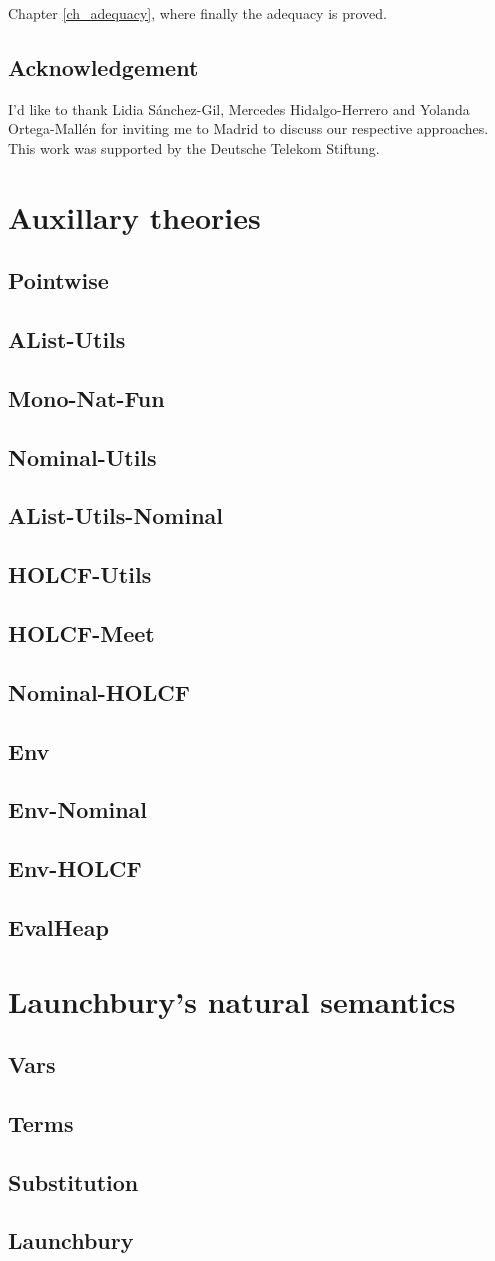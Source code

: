 \documentclass[11pt,a4paper,parskip=half]{scrartcl}
\begin{document}
Chapter \ref{ch_adequacy}, where finally the adequacy is proved.

%
%

\subsection{Acknowledgement}


I’d like to thank Lidia Sánchez-Gil, Mercedes Hidalgo-Herrero and Yolanda Ortega-Mallén for inviting me to Madrid to discuss our respective approaches.\\
This work was supported by the Deutsche Telekom Stiftung.

\clearpage
\newcommand{\theory}[1]{\subsection{#1}\label{sec_#1}}

\section{Auxillary theories}
\label{ch_aux}

\theory{Pointwise}
\theory{AList-Utils}
\theory{Mono-Nat-Fun}

\theory{Nominal-Utils}
\theory{AList-Utils-Nominal}

\theory{HOLCF-Utils}
\theory{HOLCF-Meet}
\theory{Nominal-HOLCF}


\theory{Env}
\theory{Env-Nominal}
\theory{Env-HOLCF}
\theory{EvalHeap}


\clearpage
\section{Launchbury's natural semantics}
\label{ch_natsem}

\theory{Vars}
\theory{Terms}
\theory{Substitution}
\theory{Launchbury}
\end{document}
